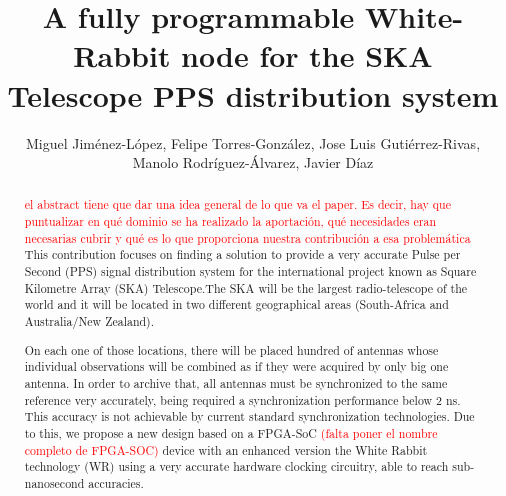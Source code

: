 \documentclass[review]{elsarticle}
\newcommand{\gutinote}[1]{\todo[bordercolor=green, backgroundcolor=yellow, noline]{#1}}
\begin{document}
\begin{frontmatter}

\title{A fully programmable White-Rabbit node for the SKA Telescope PPS distribution system} %


\author{Miguel Jiménez-López, Felipe Torres-González, Jose Luis Gutiérrez-Rivas, Manolo Rodríguez-Álvarez, Javier Díaz}
\address{CITIC, ETSIIT, University of Granada, Spain}





\begin{abstract} 
	\textcolor{red}{el abstract tiene que dar una idea general de lo que va el paper. Es decir, hay que puntualizar en qué dominio se ha realizado la aportación, qué necesidades eran necesarias cubrir y qué es lo que proporciona nuestra contribución a esa problemática}
	This contribution focuses on finding a solution to provide a very 
	accurate Pulse per Second (PPS) signal distribution system for the international project known as 
	Square Kilometre Array (SKA) Telescope.The SKA will be the largest 
	radio-telescope of the world and it will be located in two different 
	geographical areas (South-Africa and Australia/New Zealand).
    
    On each one of those locations, there will be placed hundred of antennas 
    whose individual observations will be combined as if they were acquired 
    by only big one antenna. In order to archive that, all antennas must be synchronized to the same reference very accurately, being required a synchronization performance below 2 ns. This accuracy is not achievable by current standard synchronization technologies. Due to this, we propose a new design based on a FPGA-SoC \textcolor{red}{(falta poner el nombre completo de FPGA-SOC)} device with an enhanced 
    version the White Rabbit technology (WR) using a very accurate hardware clocking circuitry, able to reach sub-nanosecond accuracies.
    

\end{abstract}
\end{frontmatter}
\end{document}
